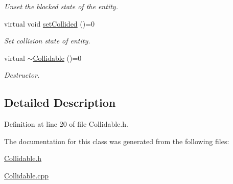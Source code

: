 \begin{DoxyCompactItemize}
\begin{DoxyCompactList}\small\item\em Unset the blocked state of the entity. \end{DoxyCompactList}\item 
\hypertarget{class_collidable_a5ea0417bea000712171bbe5531705082}{virtual void \hyperlink{class_collidable_a5ea0417bea000712171bbe5531705082}{set\+Collided} ()=0}\label{class_collidable_a5ea0417bea000712171bbe5531705082}

\begin{DoxyCompactList}\small\item\em Set collision state of entity. \end{DoxyCompactList}\item 
\hypertarget{class_collidable_ab742fb86ee54c44b706713b0d6876af7}{virtual \hyperlink{class_collidable_ab742fb86ee54c44b706713b0d6876af7}{$\sim$\+Collidable} ()=0}\label{class_collidable_ab742fb86ee54c44b706713b0d6876af7}

\begin{DoxyCompactList}\small\item\em Destructor. \end{DoxyCompactList}\end{DoxyCompactItemize}


\subsection{Detailed Description}


Definition at line 20 of file Collidable.\+h.



The documentation for this class was generated from the following files\+:\begin{DoxyCompactItemize}
\item 
\hyperlink{_collidable_8h}{Collidable.\+h}\item 
\hyperlink{_collidable_8cpp}{Collidable.\+cpp}\end{DoxyCompactItemize}
